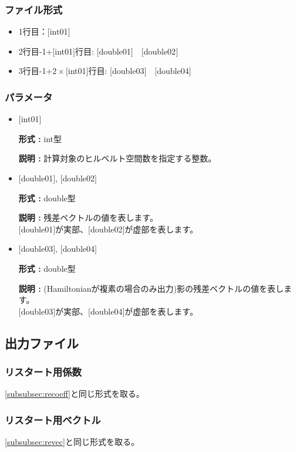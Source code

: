 \documentclass[12pt,titlepage]{jarticle}
\begin{document}
\subsubsection{ファイル形式}
 \begin{itemize}
   \item  1行目：$[$int01$]$
   \item  2行目-1+$[$int01$]$行目: $[$double01$]$~~$[$double02$]$
   \item  3行目-1+$2\times[$int01$]$行目: $[$double03$]$~~$[$double04$]$
  \end{itemize}
\subsubsection{パラメータ}
\begin{itemize}

\item  $[$int01$]$
  
  {\bf 形式 :} int型
  
  {\bf 説明 :} 計算対象のヒルベルト空間数を指定する整数。
  
\item  $[$double01$]$, $[$double02$]$
  
  {\bf 形式 :} double型 

  {\bf 説明 :} 残差ベクトルの値を表します。\\
  $[$double01$]$が実部、$[$double02$]$が虚部を表します。\\

\item  $[$double03$]$, $[$double04$]$
  
  {\bf 形式 :} double型 

  {\bf 説明 :} (Hamiltonianが複素の場合のみ出力)影の残差ベクトルの値を表します。\\
  $[$double03$]$が実部、$[$double04$]$が虚部を表します。\\

\end{itemize}

\newpage
\subsection{出力ファイル}
\subsubsection{リスタート用係数}\label{subsubsec:ResCoef}
\ref{subsubsec:recoeff}と同じ形式を取る。
\subsubsection{リスタート用ベクトル}\label{subsubsec:ResVec}
\ref{subsubsec:revec}と同じ形式を取る。
\end{document}
